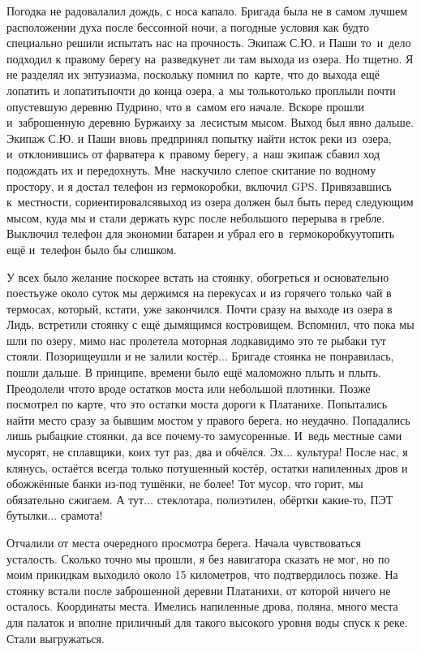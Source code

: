 Погодка не радовала\mdash лил дождь, с носа капало. Бригада была не в самом лучшем расположении духа после бессонной ночи, а погодные условия как будто специально решили испытать нас на прочность. Экипаж С.Ю. и Паши то~и~дело подходил к правому берегу на~разведку\mdash нет ли там выхода из озера. Но тщетно. Я не разделял их энтузиазма, поскольку помнил по~карте, что до выхода ещё лопатить и лопатить\mdash почти до конца озера, а~мы только\sdash только проплыли почти опустевшую деревню Пудрино, что в~самом его начале. Вскоре прошли и~заброшенную деревню Буржаиху за~лесистым мысом. Выход был явно дальше. Экипаж С.Ю. и Паши вновь предпринял попытку найти исток реки из~озера, и~отклонившись от фарватера к~правому берегу, а~наш экипаж сбавил ход подождать их и передохнуть. Мне~наскучило слепое скитание по водному простору, и я достал телефон из гермокоробки, включил GPS. Привязавшись к~местности, сориентировался\mdash выход из озера должен был быть перед следующим мысом, куда мы и стали держать курс после небольшого перерыва в гребле. Выключил телефон для экономии батареи и убрал его в~гермокоробку\mdash утопить ещё и~телефон было бы слишком.

У всех было желание поскорее встать на стоянку, обогреться и основательно поесть\mdash уже около суток мы держимся на перекусах и из горячего только чай в термосах, который, кстати, уже закончился. Почти сразу на выходе из озера в Лидь, встретили стоянку с ещё дымящимся костровищем. Вспомнил, что пока мы шли по озеру, мимо нас пролетела моторная лодка\mdash видимо это те рыбаки тут стояли. Позорище\mdash ушли и не залили костёр$\ldots$ Бригаде стоянка не понравилась, пошли дальше. В принципе, времени было ещё мало\mdash можно плыть и плыть. Преодолели что\sdash то вроде остатков моста или небольшой плотинки. Позже посмотрел по карте, что это остатки моста дороги к Платанихе. Попытались найти место сразу за бывшим мостом у правого берега, но неудачно. Попадались лишь рыбацкие стоянки, да все почему-то замусоренные. И~ведь местные сами мусорят, не сплавщики, коих тут раз, два и обчёлся. Эх$\ldots$ культура! После нас, я клянусь, остаётся всегда только потушенный костёр, остатки напиленных дров и обожжённые банки из-под тушёнки, не более! Тот мусор, что горит, мы обязательно сжигаем. А тут$\ldots$ стеклотара, полиэтилен, обёртки какие-то, ПЭТ бутылки$\ldots$ срамота! 

Отчалили от места очередного просмотра берега. Начала чувствоваться усталость. Сколько точно мы прошли, я без навигатора сказать не мог, но по моим прикидкам выходило около 15 километров, что подтвердилось позже. На стоянку встали после заброшенной деревни Платанихи, от которой ничего не осталось. Координаты места\mdash \CoordsLidSeventeenFirst. Имелись напиленные дрова, поляна, много места для палаток и вполне приличный для такого высокого уровня воды спуск к реке. Стали выгружаться. 

